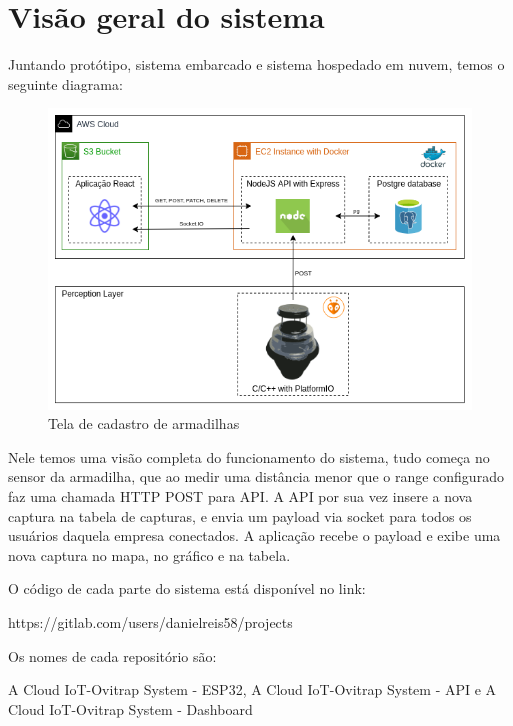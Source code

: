 \documentclass[
	12pt,				%
	openright,			%
	oneside,			%
	a4paper,			%
	chapter=TITLE,		%
	english,			%
	brazil				%
	]{abntex2}
\begin{document}
\section{Visão geral do sistema}

Juntando protótipo, sistema embarcado e sistema hospedado em nuvem, temos o seguinte diagrama:

\begin{figure}[H]
    \centering
    \includegraphics[scale=0.6]{imagens/diagramacloudarmadilha.png}
    \caption{Tela de cadastro de armadilhas}
        \label{fig:diagramacloudarmadilha}
    \end{figure}


Nele temos uma visão completa do funcionamento do sistema, tudo começa no sensor da armadilha, que ao medir uma distância menor
que o range configurado faz uma chamada HTTP POST para API. A API por sua vez insere a nova captura na tabela de capturas, e 
envia um payload via socket para todos os usuários daquela empresa conectados. A aplicação recebe o payload e exibe uma nova captura
no mapa, no gráfico e na tabela. 

O código de cada parte do sistema está disponível no link:

https://gitlab.com/users/danielreis58/projects

Os nomes de cada repositório são: 

A Cloud IoT-Ovitrap System - ESP32, A Cloud IoT-Ovitrap System - API e A Cloud IoT-Ovitrap System - Dashboard
\end{document}
